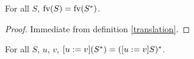 \vspace{-3mm}

\begin{LEMMA}
    \label{pres_fv}
    For all $S$, $\text{fv}(S) = \text{fv}(S^{*})$.
\end{LEMMA}

\begin{proof}
    Immediate from definition \ref{translation}.
\end{proof}

\vspace{-3mm}

\begin{LEMMA}
    \label{comm_trans_sub}
    For all $S$, $u$, $v$, $[u := v](S^{*}) = ([u := v]S)^{*}$.
\end{LEMMA}

